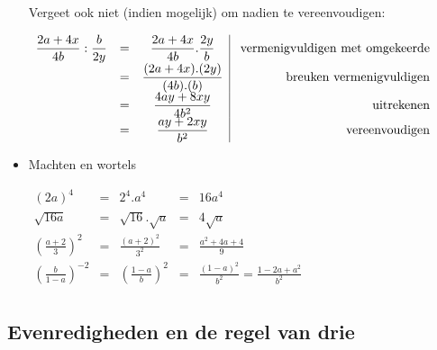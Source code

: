 \begin{itemize}
	
	
	\noindent Vergeet ook niet (indien mogelijk) om nadien te vereenvoudigen:
	
	\begin{math}
	\centering
	\begin{array}{ccc|r}
	{\displaystyle \frac{2a+4x}{4b}:\frac{b}{2y}} & = & {\displaystyle \frac{2a+4x}{4b}.\frac{2y}{b}} & \text{ vermenigvuldigen met omgekeerde}\\
	& = & {\displaystyle \frac{(2a+4x).(2y)}{(4b).(b)}} & \text{breuken vermenigvuldigen}\\
	& = & {\displaystyle \frac{4ay+8xy}{4b^{2}}} &  \text{uitrekenen}\\
	& = & {\displaystyle \frac{ay+2xy}{b^{2}}} & \text{vereenvoudigen}\\
	\end{array}
	\end{math}
	
	\item{Machten en wortels}
	
	\begin{math}
	\begin{array}{ccccc}
	(2a)^{4} & = & 2^{4}.a^{4} &=& 16a^{4} \\
	\sqrt{16a} & = & \sqrt{16}.\sqrt{a}&=&4\sqrt{a} \\
	\left(\frac{a+2}{3}\right)^{2} & = &  \frac{(a+2)^{2}}{3^{2}}&=&\frac{a^{2}+4a+4}{9} \\
	\left(\frac{b}{1-a}\right)^{-2} & = &  \left(\frac{1-a}{b}\right)^{2}&=&\frac{(1-a)^{2}}{b^{2}}=\frac{1-2a+a^{2}}{b^{2}} \\
	\end{array}
	\end{math}
	
\end{itemize}


\subsection{Evenredigheden en de regel van drie}


